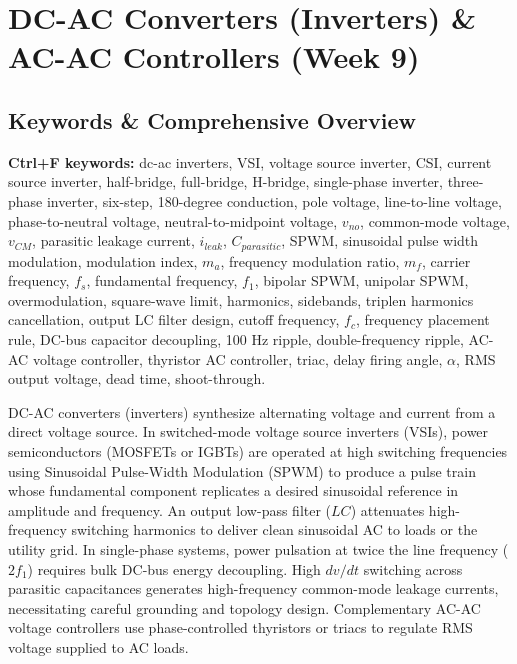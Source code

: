 \section{DC-AC Converters (Inverters) \& AC-AC Controllers (Week 9)}

\subsection{Keywords \& Comprehensive Overview}
\noindent\textbf{Ctrl+F keywords:} dc-ac inverters, VSI, voltage source inverter, CSI, current source inverter, half-bridge, full-bridge, H-bridge, single-phase inverter, three-phase inverter, six-step, 180-degree conduction, pole voltage, line-to-line voltage, phase-to-neutral voltage, neutral-to-midpoint voltage, $v_{no}$, common-mode voltage, $v_{CM}$, parasitic leakage current, $i_{leak}$, $C_{parasitic}$, SPWM, sinusoidal pulse width modulation, modulation index, $m_a$, frequency modulation ratio, $m_f$, carrier frequency, $f_s$, fundamental frequency, $f_1$, bipolar SPWM, unipolar SPWM, overmodulation, square-wave limit, harmonics, sidebands, triplen harmonics cancellation, output LC filter design, cutoff frequency, $f_c$, frequency placement rule, DC-bus capacitor decoupling, 100 Hz ripple, double-frequency ripple, AC-AC voltage controller, thyristor AC controller, triac, delay firing angle, $\alpha$, RMS output voltage, dead time, shoot-through.

\vspace{0.5em}
\noindent DC-AC converters (inverters) synthesize alternating voltage and current from a direct voltage source. In switched-mode voltage source inverters (VSIs), power semiconductors (MOSFETs or IGBTs) are operated at high switching frequencies using Sinusoidal Pulse-Width Modulation (SPWM) to produce a pulse train whose fundamental component replicates a desired sinusoidal reference in amplitude and frequency. An output low-pass filter ($LC$) attenuates high-frequency switching harmonics to deliver clean sinusoidal AC to loads or the utility grid. In single-phase systems, power pulsation at twice the line frequency ($2 f_1$) requires bulk DC-bus energy decoupling. High $dv/dt$ switching across parasitic capacitances generates high-frequency common-mode leakage currents, necessitating careful grounding and topology design. Complementary AC-AC voltage controllers use phase-controlled thyristors or triacs to regulate RMS voltage supplied to AC loads.

